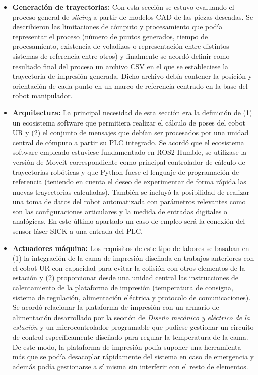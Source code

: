 \begin{itemize}
    \item \textbf{Generación de trayectorias:} Con esta sección se estuvo evaluando el proceso general de \textit{slicing} a partir de modelos \acrshort{CAD} de las piezas deseadas. Se describieron las limitaciones de cómputo y procesamiento que podía representar el proceso (número de puntos generados, tiempo de procesamiento, existencia de voladizos o representación entre distintos sistemas de referencia entre otros) y finalmente se acordó definir como resultado final del proceso un archivo CSV en el que se estableciese la trayectoria de impresión generada. Dicho archivo debía contener la posición y orientación de cada punto en un marco de referencia centrado en la base del robot manipulador.
    \item \textbf{Arquitectura:} La principal necesidad de esta sección era la definición de (1) un ecosistema software que permitiera realizar el cálculo de poses del cobot UR y (2) el conjunto de mensajes que debían ser procesados por una unidad central de cómputo a partir su \acrshort{PLC} integrado. Se acordó que el ecosistema software empleado estuviese fundamentado en ROS2 Humble, se utilizase la versión de Moveit correspondiente como principal controlador de cálculo de trayectorias robóticas y que Python fuese el lenguaje de programación de referencia (teniendo en cuenta el deseo de experimentar de forma rápida las nuevas trayectorias calculadas). También se incluyó la posibilidad de realizar una toma de datos del robot automatizada con parámetros relevantes como son las configuraciones articulares y la medida de entradas digitales o analógicas. En este último apartado un caso de empleo será la conexión del sensor láser SICK a una entrada del \acrshort{PLC}.
    \item \textbf{Actuadores máquina:} Los requisitos de este tipo de labores se basaban en (1) la integración de la cama de impresión diseñada en trabajos anteriores \cite{TFM_IñakiEchepare} con el cobot UR con capacidad para evitar la colisión con otros elementos de la estación y (2) proporcionar desde una unidad central las instrucciones de calentamiento de la plataforma de impresión (temperatura de consigna, sistema de regulación, alimentación eléctrica y protocolo de comunicaciones). Se acordó relacionar la plataforma de impresión con un armario de alimentación desarrollado por la sección de \textit{Diseño mecánico y eléctrico de la estación} y un microcontrolador programable que pudiese gestionar un circuito de control específicamente diseñado para regular la temperatura de la cama. De este modo, la plataforma de impresión podía suponer una herramienta más que se podía desacoplar rápidamente del sistema en caso de emergencia y además podía gestionarse a sí misma sin interferir con el resto de elementos.
\end{itemize}

